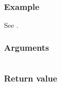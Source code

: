 \documentclass[letterpaper,10pt,english]{sphinxmanual}
\begin{document}
\subsubsection*{Example}

See {\hyperref[\detokenize{programming-interface/runtime/platform:platform-example}]{}}.


\paragraph{}
\label{\detokenize{programming-interface/runtime/device:has-extension}}
\begin{sphinxVerbatim}[commandchars=\\\{\}]
    
\end{sphinxVerbatim}
\subsubsection*{Arguments}


\begin{savenotes}\sphinxattablestart
\centering
\begin{tabulary}{\linewidth}[t]{|T|T|}
\hline

&\\
\hline
\end{tabulary}
\par
\sphinxattableend\end{savenotes}
\subsubsection*{Return value}
\end{document}
